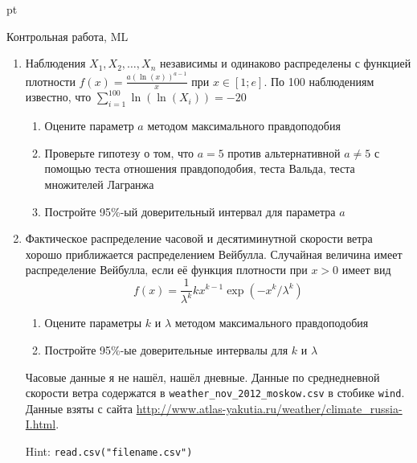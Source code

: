 \documentclass[pdftex,12pt,a4paper]{article}
\begin{document}
 pt %

\begin{center}
Контрольная работа, ML
\end{center}

\WhiteRoseLine

\begin{enumerate}
\item Наблюдения $X_1,X_2,\ldots,X_n$ независимы и одинаково распределены с функцией плотности $f(x)=\frac{a(\ln(x))^{a-1}}{x}$ при $x\in [1;e]$. По 100 наблюдениям известно, что $\sum_{i=1}^{100} \ln(\ln(X_i))=-20$
\begin{enumerate}
\item Оцените параметр $a$ методом максимального правдоподобия
\item Проверьте гипотезу о том, что $a=5$ против альтернативной $a\neq 5$ с помощью теста отношения правдоподобия, теста Вальда, теста множителей Лагранжа
\item Постройте 95\%-ый доверительный интервал для параметра $a$
\end{enumerate}
\item \useR Фактическое распределение часовой и десятиминутной скорости ветра хорошо приближается распределением Вейбулла. Случайная величина имеет распределение Вейбулла, если её функция плотности при $x>0$ имеет вид
\[
f(x)=\frac{1}{\lambda^k}kx^{k-1}\exp(-x^k/\lambda^k)
\]
\begin{enumerate}
\item Оцените параметры $k$ и $\lambda$ методом максимального правдоподобия
\item Постройте 95\%-ые доверительные интервалы для $k$ и $\lambda$
\end{enumerate}
Часовые данные я не нашёл, нашёл дневные. Данные по среднедневной скорости ветра содержатся в \verb|weather_nov_2012_moskow.csv| в стобике \verb|wind|. Данные взяты с сайта \url{http://www.atlas-yakutia.ru/weather/climate_russia-I.html}.

Hint: \verb|read.csv("filename.csv")|
\end{enumerate}

\RedRoseLine
\end{document}
